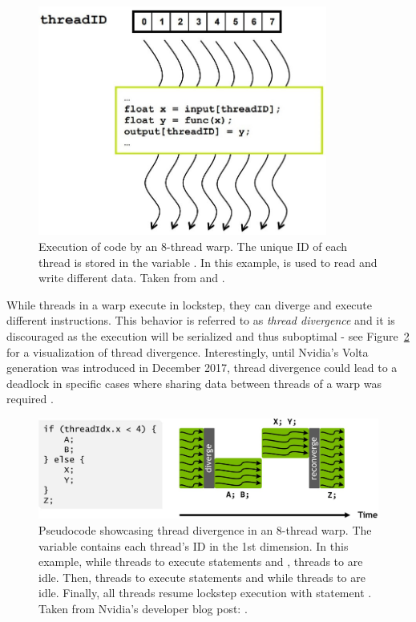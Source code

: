 \begin{figure}[ht!]
	\centering
	\includegraphics[width=9.5cm, keepaspectratio, clip]{images/ch01/CUDA_thread_parallelism.jpg}
	\caption{Execution of code by an 8-thread warp.
		The unique ID of each thread is stored in the variable .
		In this example,  is used to read and write different data.
		Taken from  \cite{Ruetsch2008} and  \cite{Cejka2022}.
	}
	\label{Figure:theory->CUDA->thread-management->thread-parallelism}
\end{figure}

While threads in a warp execute in lockstep, they can diverge and execute different instructions.
This behavior is referred to as \textit{thread divergence} and it is discouraged as the execution will be serialized and thus suboptimal - see Figure~\ref{Figure:theory->CUDA->thread-management->thread-divergence} for a visualization of thread divergence.
Interestingly, until Nvidia's Volta generation was introduced in December 2017, thread divergence could lead to a deadlock in specific cases where sharing data between threads of a warp was required \cite{NVIDIADecember2022, Grote2020}.

\begin{figure}[ht!]
	\centering
	\includegraphics[width=14cm, keepaspectratio]{images/ch01/CUDA_warp_divergence_execution_path.jpg}
	\caption{Pseudocode showcasing thread divergence in an 8-thread warp.
		The  variable contains each thread's ID in the 1st dimension.
		In this example, while threads  to  execute statements  and , threads  to  are idle.
		Then, threads  to  execute statements  and  while threads  to  are idle.
		Finally, all threads resume lockstep execution with statement .
		Taken from Nvidia's developer blog post:  \cite{Durant10May2017}.
	}
	\label{Figure:theory->CUDA->thread-management->thread-divergence}
\end{figure}

